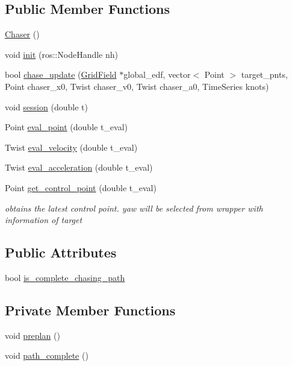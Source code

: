 \subsection*{Public Member Functions}
\begin{DoxyCompactItemize}
\item 
\hyperlink{class_chaser_ae1179fa7b77db9c80468f88222e32f09}{Chaser} ()
\item 
void \hyperlink{class_chaser_a3538485980643e885755608e4297d1f6}{init} (ros\+::\+Node\+Handle nh)
\item 
bool \hyperlink{class_chaser_a8feeca68466b9b4576ee9c99b624dfc5}{chase\+\_\+update} (\hyperlink{struct_grid_field}{Grid\+Field} $\ast$global\+\_\+edf, vector$<$ Point $>$ target\+\_\+pnts, Point chaser\+\_\+x0, Twist chaser\+\_\+v0, Twist chaser\+\_\+a0, Time\+Series knots)
\item 
void \hyperlink{class_chaser_a7d736728bb5327acf0d334d7d4b1b844}{session} (double t)
\item 
Point \hyperlink{class_chaser_a6dca60b8af1c63eff3235515255cf355}{eval\+\_\+point} (double t\+\_\+eval)
\item 
Twist \hyperlink{class_chaser_a208374e7b85f9a35c1c00ec4f1ec65c3}{eval\+\_\+velocity} (double t\+\_\+eval)
\item 
Twist \hyperlink{class_chaser_a2fe36102d5a9befcb4c6ada3375260ed}{eval\+\_\+acceleration} (double t\+\_\+eval)
\item 
Point \hyperlink{class_chaser_a7a42e3dd3ca45e343652318e591f87d1}{get\+\_\+control\+\_\+point} (double t\+\_\+eval)
\begin{DoxyCompactList}\small\item\em obtains the latest control point. yaw will be selected from wrapper with information of target \end{DoxyCompactList}\end{DoxyCompactItemize}
\subsection*{Public Attributes}
\begin{DoxyCompactItemize}
\item 
bool \hyperlink{class_chaser_a53af032471ad6bdc828c4eae78085813}{is\+\_\+complete\+\_\+chasing\+\_\+path}
\end{DoxyCompactItemize}
\subsection*{Private Member Functions}
\begin{DoxyCompactItemize}
\item 
void \hyperlink{class_chaser_a5169e2a07c5d86d144880be3d9c7d6b9}{preplan} ()
\item 
void \hyperlink{class_chaser_aa70b57b1d92a22f56199ee3d0460a4f7}{path\+\_\+complete} ()
\end{DoxyCompactItemize}
